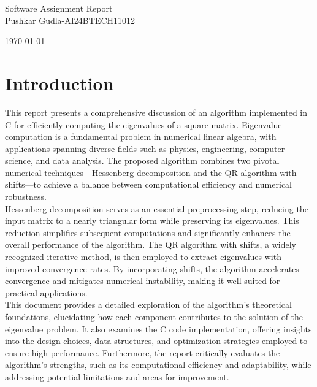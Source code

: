 \documentclass[a4paper,11pt,oneside]{report}
\begin{document}
  
    
    \begin{titlepage}      
        \begin{center}
        \linespread{4}\huge {           
                Software Assignment Report
}\\
            {\Large 
                Pushkar Gudla-AI24BTECH11012             
            }\\[2.5cm] 
            \vfill
            
            
            \today %
        \end{center}
    \end{titlepage}
    \newpage    
    \tableofcontents

\newpage
\chapter{Introduction}
This report presents a comprehensive discussion of an algorithm implemented in C for efficiently computing the eigenvalues of a square matrix. Eigenvalue computation is a fundamental problem in numerical linear algebra, with applications spanning diverse fields such as physics, engineering, computer science, and data analysis. The proposed algorithm combines two pivotal numerical techniques—Hessenberg decomposition and the QR algorithm with shifts—to achieve a balance between computational efficiency and numerical robustness.
\\

Hessenberg decomposition serves as an essential preprocessing step, reducing the input matrix to a nearly triangular form while preserving its eigenvalues. This reduction simplifies subsequent computations and significantly enhances the overall performance of the algorithm. The QR algorithm with shifts, a widely recognized iterative method, is then employed to extract eigenvalues with improved convergence rates. By incorporating shifts, the algorithm accelerates convergence and mitigates numerical instability, making it well-suited for practical applications.\
\\

This document provides a detailed exploration of the algorithm's theoretical foundations, elucidating how each component contributes to the solution of the eigenvalue problem. It also examines the C code implementation, offering insights into the design choices, data structures, and optimization strategies employed to ensure high performance. Furthermore, the report critically evaluates the algorithm's strengths, such as its computational efficiency and adaptability, while addressing potential limitations and areas for improvement.
\end{document}
